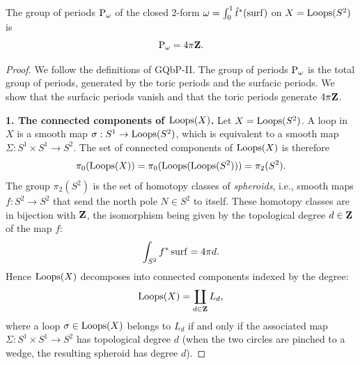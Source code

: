 \documentclass[11pt,reqno,letterpaper,twoside]{amsart}
\begin{document}
  \begin{proposition}{}
    The group of periods $\operatorname{P}_\omega$ of the closed $2$-form $\omega = \int_{0}^{1} \hat{t}^{*}(\operatorname{surf})$
    on $X = \operatorname{Loops}(S^{2})$ is
    \[
      \operatorname{P}_\omega = 4\pi {\mathbf{Z}}.
      \]
  \end{proposition}
  
  \begin{proof}
    We follow the definitions of GQbP-II.  The group of periods $\operatorname{P}_\omega$ is the total group
    of periods, generated by the toric periods and the surfacic periods.  We show that the
    surfacic periods vanish and that the toric periods generate $4\pi {\mathbf{Z}}$.
    
    \medskip
    \noindent\textbf{1.  The connected components of $\operatorname{Loops}(X)$.}
    Let $X = \operatorname{Loops}(S^{2})$.  A loop in $X$ is a smooth map $\sigma : S^{1} \to \operatorname{Loops}(S^{2})$,
    which is equivalent to a smooth map $\Sigma : S^{1} \times S^{1} \to S^{2}$.
    The set of connected components of $\operatorname{Loops}(X)$ is therefore
    \[
      \pi_{0}(\operatorname{Loops}(X)) = \pi_{0}(\operatorname{Loops}(\operatorname{Loops}(S^{2}))) = \pi_{2}(S^{2}).
      \]
    The group $\pi_{2}(S^{2})$ is the set of homotopy classes of \emph{spheroids},
    i.e., smooth maps $f : S^{2} \to S^{2}$ that send the north pole $N \in S^{2}$ to itself.
    These homotopy classes are in bijection with ${\mathbf{Z}}$, the isomorphism being given by the
    topological degree $d \in {\mathbf{Z}}$ of the map $f$:
    \[
      \int_{S^{2}} f^{*}\operatorname{surf} = 4\pi d.
      \]
    Hence $\operatorname{Loops}(X)$ decomposes into connected components indexed by the degree:
    \[
      \operatorname{Loops}(X) = \coprod_{d \in {\mathbf{Z}}} L_{d},
      \]
    where a loop $\sigma \in \operatorname{Loops}(X)$ belongs to $L_{d}$ if and only if the associated map
    $\Sigma : S^{1} \times S^{1} \to S^{2}$ has topological degree $d$ (when the two circles
    are pinched to a wedge, the resulting spheroid has degree $d$).
    

\end{proof}
\end{document}
